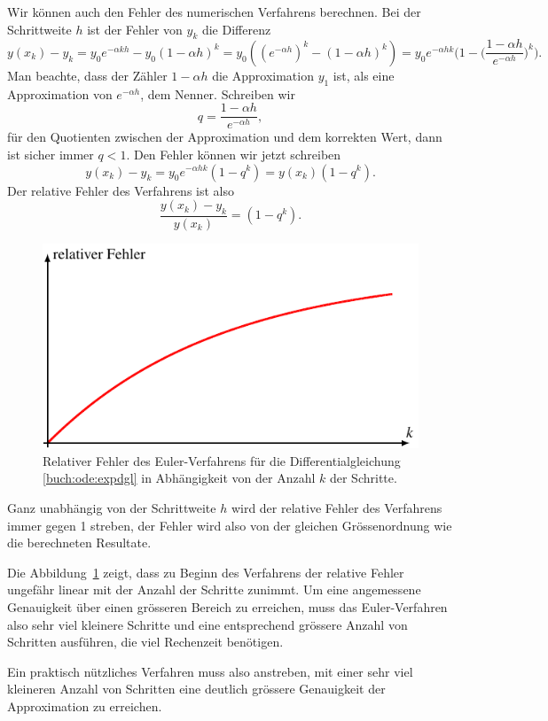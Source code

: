 Wir können auch den Fehler des numerischen Verfahrens berechnen.
Bei der Schrittweite $h$ ist der Fehler von $y_k$ die Differenz
\[
y(x_k)-y_k
=
y_0e^{-\alpha kh}-y_0(1-\alpha h)^k
=
y_0((e^{-\alpha h})^k - (1-\alpha h)^k)
=
y_0e^{-\alpha hk}\biggl(
1-\biggl(\frac{1-\alpha h}{e^{-\alpha h}}\biggr)^k
\biggr).
\]
Man beachte, dass der Zähler $1-\alpha h$ die Approximation
$y_1$ ist, als eine Approximation von $e^{-\alpha h}$, dem Nenner.
Schreiben wir
\[
q=\frac{1-\alpha h}{e^{-\alpha h}},
\]
für den Quotienten zwischen der Approximation und dem korrekten Wert,
dann ist sicher immer $q<1$.
Den Fehler können wir jetzt schreiben
\[
y(x_k)-y_k = y_0e^{-\alpha hk}(1-q^k) = y(x_k)(1-q^k).
\]
Der relative Fehler des Verfahrens ist also
\[
\frac{y(x_k)-y_k}{y(x_k)}=(1-q^k).
\]
\begin{figure}
\centering
\includegraphics{chapters/50-ode/figures/relativ.pdf}
\caption{Relativer Fehler des Euler-Verfahrens für die Differentialgleichung
\eqref{buch:ode:expdgl} in Abhängigkeit von der Anzahl $k$ der Schritte.
%
\label{buch:ode:relfehler}}
\end{figure}%
Ganz unabhängig von der Schrittweite $h$ wird der relative Fehler
des Verfahrens immer gegen 1 streben, der Fehler wird also von der
gleichen Grössenordnung wie die berechneten Resultate.
%

Die Abbildung~\ref{buch:ode:relfehler} zeigt, dass zu Beginn des Verfahrens
der relative Fehler ungefähr linear mit der Anzahl der Schritte zunimmt.
Um eine angemessene Genauigkeit über einen grösseren Bereich
zu erreichen, muss das Euler-Verfahren also sehr viel kleinere Schritte
und eine entsprechend grössere Anzahl von Schritten ausführen,
die viel Rechenzeit benötigen.
%

Ein praktisch nützliches Verfahren muss also anstreben, mit einer
sehr viel kleineren Anzahl von Schritten eine deutlich grössere Genauigkeit
der Approximation zu erreichen.



